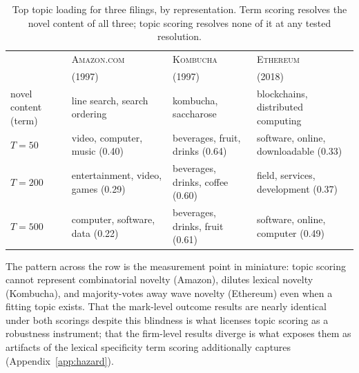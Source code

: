 \documentclass[11pt]{article}
\begin{document}
\begin{table}[h]\centering\small
\caption{Top topic loading for three filings, by representation. Term
scoring resolves the novel content of all three; topic scoring resolves
none of it at any tested resolution.}
\label{tab:exhibit}
\begin{tabular}{lp{3.1cm}p{3.1cm}p{3.1cm}}
\toprule
& \textsc{Amazon.com} & \textsc{Kombucha} & \textsc{Ethereum} \\
& (1997) & (1997) & (2018) \\
\midrule
novel content (term) & line search, search ordering & kombucha, saccharose & blockchains, distributed computing \\
$T=50$ & video, computer, music (0.40) & beverages, fruit, drinks (0.64) & software, online, downloadable (0.33) \\
$T=200$ & entertainment, video, games (0.29) & beverages, drinks, coffee (0.60) & field, services, development (0.37) \\
$T=500$ & computer, software, data (0.22) & beverages, drinks, fruit (0.61) & software, online, computer (0.49) \\
\bottomrule
\end{tabular}
\end{table}

The pattern across the row is the measurement point in miniature: topic
scoring cannot represent combinatorial novelty (Amazon), dilutes lexical
novelty (Kombucha), and majority-votes away wave novelty (Ethereum) even
when a fitting topic exists. That the mark-level outcome results are
nearly identical under both scorings despite this blindness is what
licenses topic scoring as a robustness instrument; that the firm-level
results diverge is what exposes them as artifacts of the lexical
specificity term scoring additionally captures
(Appendix~\ref{app:hazard}).
\end{document}
